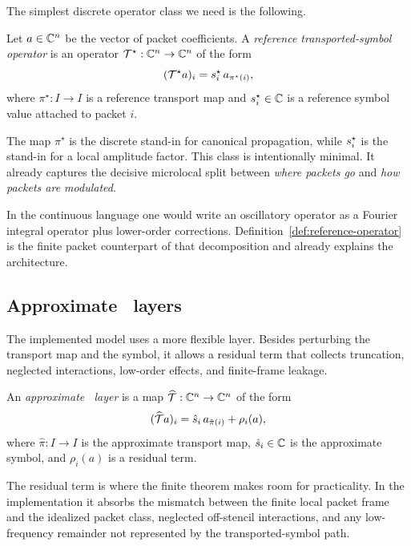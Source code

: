 The simplest discrete operator class we need is the following.

\begin{definition}
\label{def:reference-operator}
Let $a\in\mathbb C^n$ be the vector of packet coefficients. A \emph{reference transported-symbol operator} is an operator $\mathcal T^\star:\mathbb C^n\to\mathbb C^n$ of the form
\[
(\mathcal T^\star a)_i = s^\star_i\, a_{\pi^\star(i)},
\]
where $\pi^\star:I\to I$ is a reference transport map and $s^\star_i\in\mathbb C$ is a reference symbol value attached to packet $i$.
\end{definition}

The map $\pi^\star$ is the discrete stand-in for canonical propagation, while $s^\star_i$ is the stand-in for a local amplitude factor. This class is intentionally minimal. It already captures the decisive microlocal split between \emph{where packets go} and \emph{how packets are modulated}.

In the continuous language one would write an oscillatory operator as a Fourier integral operator plus lower-order corrections. Definition~\ref{def:reference-operator} is the finite packet counterpart of that decomposition and already explains the architecture.

\subsection{Approximate \MiNO\ layers}

The implemented model uses a more flexible layer. Besides perturbing the transport map and the symbol, it allows a residual term that collects truncation, neglected interactions, low-order effects, and finite-frame leakage.

\begin{definition}
\label{def:approx-layer}
An \emph{approximate \MiNO\ layer} is a map $\widehat{\mathcal T}:\mathbb C^n\to\mathbb C^n$ of the form
\[
(\widehat{\mathcal T} a)_i = \hat s_i\, a_{\hat\pi(i)} + \rho_i(a),
\]
where $\hat\pi:I\to I$ is the approximate transport map, $\hat s_i\in\mathbb C$ is the approximate symbol, and $\rho_i(a)$ is a residual term.
\end{definition}

The residual term is where the finite theorem makes room for practicality. In the implementation it absorbs the mismatch between the finite local packet frame and the idealized packet class, neglected off-stencil interactions, and any low-frequency remainder not represented by the transported-symbol path.

